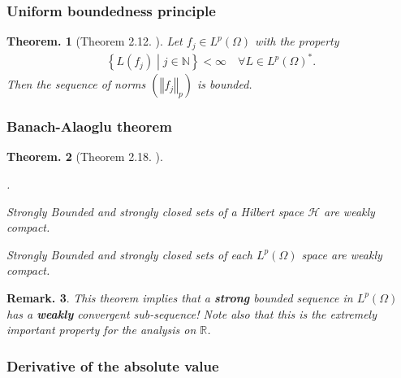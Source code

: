 \documentclass[openany, a4paper, oneside]{jsbook}
\newcounter{enum2}
\renewenvironment{enumerate}{%
\begin{list}%
{%
\arabic{enum2}.\ \,%
}%
{%
\usecounter{enum2}
\setlength{\itemindent}{0pt}%
\setlength{\leftmargin}{15pt}%
\setlength{\rightmargin}{0pt}%
\setlength{\labelsep}{0pt}%
\setlength{\labelwidth}{6pt}%
\setlength{\itemsep}{0pt}%
\setlength{\parsep}{0pt}%
\setlength{\listparindent}{0pt}%
}
}{%
\end{list}%
}
\theoremstyle{break}
\theoremstyle{breakdefn}
\newtheorem{thm}{Theorem.}[section]
\newtheorem{rem}[thm]{Remark.}
\newcommand{\norm}[1]{\left\Vert#1\right\Vert}
\newcommand{\rbk}[1]{\left (#1\right)}
\newcommand{\relmiddle}[1]{\mathrel{}\middle#1\mathrel{}}
\newcommand{\set}[2]{\left\{#1 \relmiddle| #2\right\}}
\newcommand{\bbN}{\mathbb{N}}
\newcommand{\bbR}{\mathbb{R}}
\newcommand{\calH}{\mathcal{H}}
\newcommand{\upbf}[1]{\textup{\textbf{#1}}}
\begin{document}
\subsubsection{Uniform boundedness principle}


\begin{thm}[Theorem 2.12. \cite{LiebLoss1}]\label{Lieb-Loss_Analysis_chap11_2}
 Let $f_j \in L^p (\Omega)$ with the property
 \begin{align}
  \set{L (f_j)}{j \in \bbN} < \infty \quad \forall L \in L^p \rbk{\Omega}^*.
 \end{align}
 Then the sequence of norms $(\norm{f_j}_p)$ is bounded.
\end{thm}
\subsubsection{Banach-Alaoglu theorem}


\begin{thm}[Theorem 2.18. \cite{LiebLoss1}]\label{Lieb-Loss_Analysis_chap11_8}
\begin{enumerate}
\item Strongly Bounded and strongly closed sets of a Hilbert space $\calH$ are weakly compact.
\item Strongly Bounded and strongly closed sets of each $L^p \rbk{\Omega}$ space are weakly compact.
\end{enumerate}
\end{thm}
\begin{rem}
 This theorem implies that a \upbf{strong} bounded sequence in $L^p (\Omega)$ has a \upbf{weakly} convergent sub-sequence!
 Note also that this is the extremely important property for the analysis on $\bbR$.
\end{rem}
\subsubsection{Derivative of the absolute value}
\end{document}
